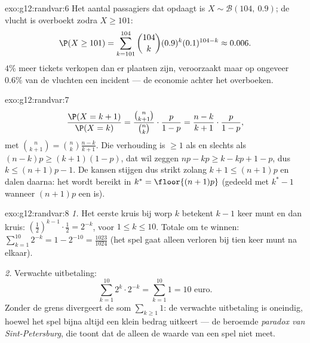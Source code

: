 \begin{solution}{exo:g12:randvar:6}
Het aantal passagiers dat opdaagt is $X \sim \mathcal B(104,\ 0.9)$; de
vlucht is overboekt zodra $X \geq 101$:
\[
\P(X \geq 101) = \sum_{k=101}^{104}\binom{104}{k}(0.9)^k(0.1)^{104-k}
\approx 0.006 .
\]
$4\%$ meer tickets verkopen dan er plaatsen zijn, veroorzaakt maar op ongeveer
$0.6\%$ van de vluchten een incident --- de economie achter het overboeken.
\end{solution}

\begin{solution}{exo:g12:randvar:7}
\[
\frac{\P(X = k+1)}{\P(X = k)}
= \frac{\binom{n}{k+1}}{\binom nk}\cdot\frac{p}{1-p}
= \frac{n - k}{k + 1}\cdot\frac{p}{1-p},
\]
met $\binom{n}{k+1} = \binom nk \frac{n-k}{k+1}$. Die verhouding is $\geq 1$
als en slechts als $(n-k)p \geq (k+1)(1-p)$, dat wil zeggen
$np - k p \geq k - kp + 1 - p$, dus $k \leq (n+1)p - 1$. De kansen stijgen dus
strikt zolang $k + 1 \leq (n+1)p$ en dalen daarna: het  wordt bereikt
in $k^* = \floor{(n+1)p}$ (gedeeld met $k^* - 1$ wanneer $(n+1)p$ een  is).
\end{solution}

\begin{solution}{exo:g12:randvar:8}
\emph{1.} Het eerste kruis bij worp $k$ betekent $k-1$ keer munt en dan kruis:
 $\left(\frac12\right)^{k-1}\cdot\frac12 = 2^{-k}$, voor
$1 \leq k \leq 10$. Totale  om te winnen:
$\sum_{k=1}^{10} 2^{-k} = 1 - 2^{-10} = \frac{1023}{1024}$ (het spel gaat
alleen verloren bij tien keer munt na elkaar).

\emph{2.} Verwachte uitbetaling:
\[
\sum_{k=1}^{10} 2^k \cdot 2^{-k} = \sum_{k=1}^{10} 1 = 10 \text{ euro}.
\]
Zonder de grens divergeert de som $\sum_{k\geq1} 1$: de verwachte uitbetaling
is oneindig, hoewel het spel bijna altijd een klein bedrag uitkeert --- de
beroemde \emph{paradox van Sint-Petersburg}, die toont dat de
 alleen de waarde van een spel niet meet.
\end{solution}

